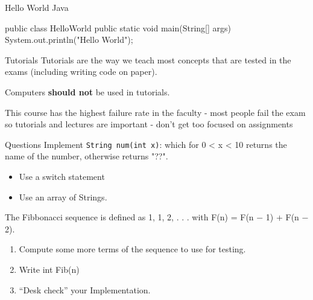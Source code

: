 \documentclass[week2]{csse2002}
\begin{document}
\begin{topic}{Hello World Java}
\begin{java}
public class HelloWorld {
    public static void main(String[] args) {
        System.out.println("Hello World");
    }
}
\end{java}
\end{topic}

\begin{topic}{Tutorials}
Tutorials are the way we teach most concepts that are tested in the exams (including writing code on paper).

Computers \textbf{should not} be used in tutorials.

This course has the highest failure rate in the faculty - most people fail the exam so tutorials and lectures are important - don't get too focused on assignments
\end{topic}

\begin{topic}{Questions}
Implement \texttt{String num(int x)}: which for 0 < x < 10 returns the name of the number, otherwise returns "??".
\begin{itemize}
\item Use a switch statement
\item Use an array of Strings.
\end{itemize}

The Fibbonacci sequence is defined as 1, 1, 2, . . . with F(n) = F(n − 1) + F(n − 2).
\begin{enumerate}
\item Compute some more terms of the sequence to use for testing.
\item Write int Fib(n)
\item “Desk check” your Implementation.
\end{enumerate}
\end{topic}
\end{document}
